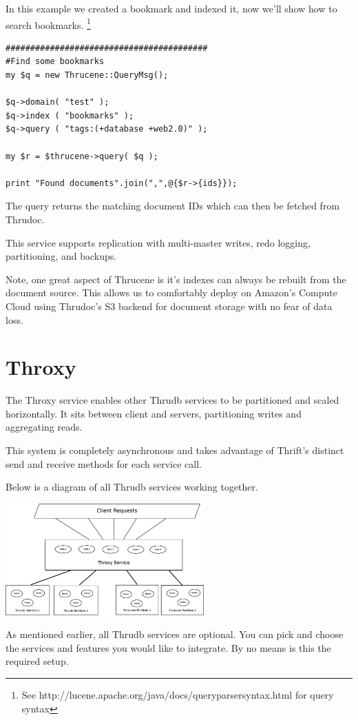 \documentclass[nocopyrightspace,blockstyle]{sigplanconf}
\begin{document}
In this example we created a bookmark and indexed it, now we'll show how to search bookmarks.
\footnote{See http://lucene.apache.org/java/docs/queryparsersyntax.html for query syntax}

\begin{verbatim}
#########################################
#Find some bookmarks
my $q = new Thrucene::QueryMsg();

$q->domain( "test" );
$q->index ( "bookmarks" );
$q->query ( "tags:(+database +web2.0)" );

my $r = $thrucene->query( $q );

print "Found documents".join(",",@{$r->{ids}});

\end{verbatim}

The query returns the matching document IDs which can then be
fetched from Thrudoc.

This service supports replication with multi-master writes, redo logging, partitioning, and backups.

Note, one great aspect of Thrucene is it's indexes can always be rebuilt from the document source.
This allows us to comfortably deploy on Amazon's Compute Cloud using Thrudoc's S3 backend for
document storage with no fear of data loss.

\section{Throxy}

The Throxy service enables other Thrudb services to be partitioned and scaled horizontally.
It sits between client and servers, partitioning writes and aggregating reads.

This system is completely asynchronous and takes advantage of
Thrift's distinct send and receive methods for each service call.

Below is a diagram of all Thrudb services working together.

\includegraphics[width=3.00in]{Throxy.eps}

As mentioned earlier, all Thrudb services are optional. You can pick and choose the services and features you would like to integrate.
By no means is this the required setup.
\end{document}
